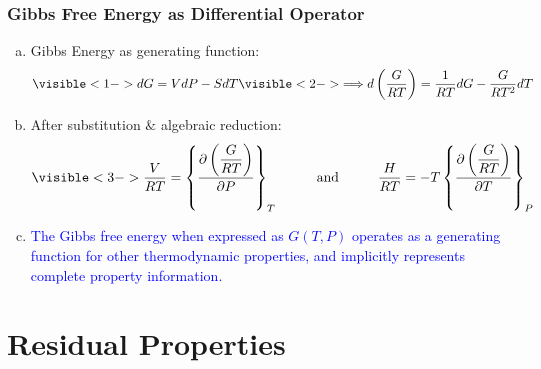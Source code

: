 \documentclass[10pt,compress]{beamer}
\newcommand{\frc}{\displaystyle\frac}
\begin{document}
\begin{frame}
  \frametitle{Gibbs Free Energy as Differential Operator}
     \begin{enumerate}[(a)]
        \item<1-> Gibbs Energy as generating function:
              \begin{displaymath}
                 \visible<1->{dG = VdP - SdT} \visible<2->{\Longrightarrow d\left(\frc{G}{RT}\right) = \frc{1}{RT}dG - \frc{G}{RT^{2}}dT} \nonumber 
              \end{displaymath}

        \item<3-> After substitution $\&$ algebraic reduction:
              \begin{displaymath}
                  \visible<3->{\frc{V}{RT} = \left\{ \frc{\partial\left(\frc{G}{RT}\right)}{\partial P}\right\}_{T} \hspace{1cm}\text{and}\hspace{1cm} \frc{H}{RT} = -T\left\{ \frc{\partial\left(\frc{G}{RT}\right)}{\partial T}\right\}_{P}}
              \end{displaymath}

        \item<4-> \textcolor{blue}{The Gibbs free energy when expressed as $G\left(T,P\right)$ operates as a generating function for other thermodynamic properties, and implicitly represents complete property information.}
     \end{enumerate}

\end{frame}
\normalsize

\section{Residual Properties}
\end{document}
